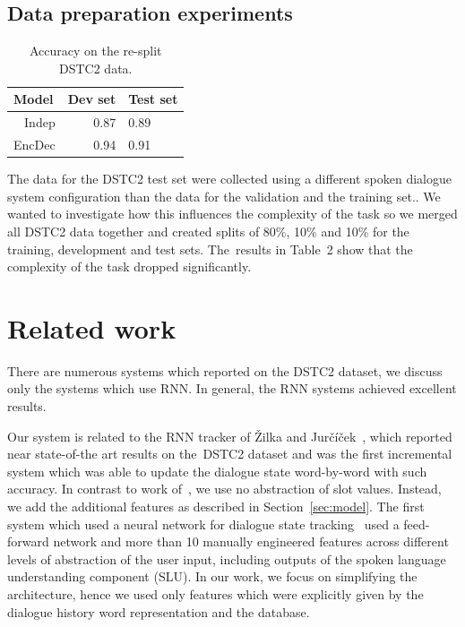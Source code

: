 \documentclass{itatnew}
\begin{document}
\subsection{Data preparation experiments}
\label{sec:split}

\begin{table}
\begin{center}
\begin{tabular}{r@{\quad}rll}
\hline
\multicolumn{1}{l}{\rule{0pt}{12pt}
                   Model}&\multicolumn{1}{l}{Dev set}&\multicolumn{2}{l}{Test set}\\[2pt]
\hline\rule{0pt}{12pt}
Indep  &   0.87 & 0.89 \\
EncDec &   0.94 & 0.91 \\
\hline
\end{tabular}
\caption{Accuracy on the re-split DSTC2 data.}
\vspace{-2em}
\end{center}
\label{tabsplit}
\end{table}

The data for the DSTC2 test set were collected using a different spoken dialogue system configuration than the data for the validation and the training set.\cite{henderson2014second}.
We wanted to investigate how this influences the complexity of the task so we merged all DSTC2 data together and created splits of 80\%, 10\% and 10\% for the training, development and test sets.
The~results in Table~2 show that the complexity of the task dropped significantly.


\section{Related work}
\label{sec:related}

There are numerous systems which reported on the DSTC2 dataset, we discuss only the systems which use RNN.
In general, the RNN systems achieved excellent results.

Our system is related to the RNN tracker of Žilka and Jurčíček~\cite{zilka2015incremental},
which reported near state-of-the art results on the~DSTC2 dataset and was the first incremental system which was able to update the dialogue state word-by-word with such accuracy.
In contrast to work of~\cite{zilka2015incremental}, we use no abstraction of slot values. Instead, we add the additional features as described in Section~\ref{sec:model}.
The first system which used a neural network for dialogue state tracking~\cite{henderson2013deep} used a feed-forward network and more than 10 manually engineered features across different levels of abstraction of the user input, including outputs of the spoken language understanding component (SLU).
In our work, we focus on simplifying the architecture, hence we used only features which were explicitly given by the dialogue history word representation and the database.
\end{document}
